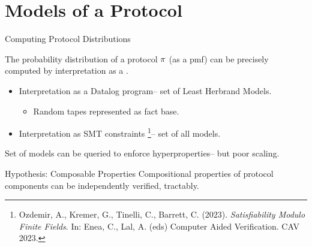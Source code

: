 \documentclass{beamer}
\begin{document}
\section{Models of a Protocol}

\begin{frame}{Computing Protocol Distributions}

  The probability distribution of a protocol $\pi$ (as a pmf) can be precisely computed
  by interpretation as a .
  \begin{itemize}
  \item Interpretation as a Datalog program-- set of Least Herbrand Models.
    \begin{itemize}
      \item Random tapes represented as fact base.
    \end{itemize}
  \item Interpretation as SMT constraints \footnote{Ozdemir, A., Kremer, G., Tinelli, C., Barrett, C. (2023). \emph{Satisfiability Modulo Finite Fields}. In: Enea, C., Lal, A. (eds) Computer Aided Verification. CAV 2023. }-- set of all models.
  \end{itemize}
  Set of models can be queried to enforce hyperproperties-- but poor scaling.

  \begin{alertblock}{Hypothesis: Composable Properties}
    Compositional properties of protocol components can be independently verified, tractably.
  \end{alertblock}
  
\end{frame}
\end{document}

